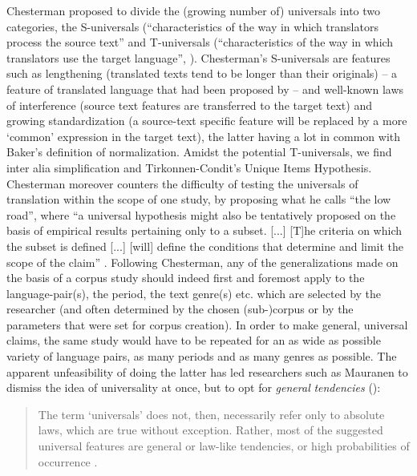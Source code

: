 Chesterman proposed to divide the (growing number of) universals into two categories, the S-universals (“characteristics of the way in which translators process the source text” \citealt[39]{gambier_what_2004} and T-universals (“characteristics of the way in which translators use the target language”, \citealt[39]{gambier_what_2004}). Chesterman’s S-universals are features such as lengthening (translated texts tend to be longer than their originals) – a feature of translated language that had been proposed by  \citet[185]{vinay_stylistique_1958} – and  well-known laws of interference (source text features are transferred to the target text) and growing standardization (a source-text specific feature will be replaced by a more ‘common’ expression in the target text), the latter having a lot in common with Baker’s definition of normalization. Amidst the potential T-universals, we find inter alia simplification and Tirkonnen-Condit’s Unique Items Hypothesis. Chesterman moreover counters the difficulty of testing the universals of translation within the scope of one study, by proposing what he calls “the low road”, where “a universal hypothesis might also be tentatively proposed on the basis of empirical results pertaining only to a subset. [...] [T]he criteria on which the subset is defined [...] [will] define the conditions that determine and limit the scope of the claim” \citep[40]{gambier_what_2004}. Following Chesterman, any of the generalizations made on the basis of a corpus study should indeed first and foremost apply to the language-pair(s), the period, the text genre(s) etc. which are selected by the researcher (and often determined by the chosen (sub-)corpus or by the parameters that were set for corpus creation). In order to make general, universal claims, the same study would have to be repeated for an as wide as possible variety of language pairs, as many periods and as many genres as possible. The apparent unfeasibility of doing the latter has led researchers such as Mauranen to dismiss the idea of universality at once, but to opt for \textit{general} \textit{tendencies} (\citeyear[35]{anderman_universal_2008}):

\begin{quote}
The term ‘universals’ does not, then, necessarily refer only to absolute laws, which are true without exception. Rather, most of the suggested universal features are general or law-like tendencies, or high probabilities of occurrence \citep[35]{anderman_universal_2008}.
\end{quote}

